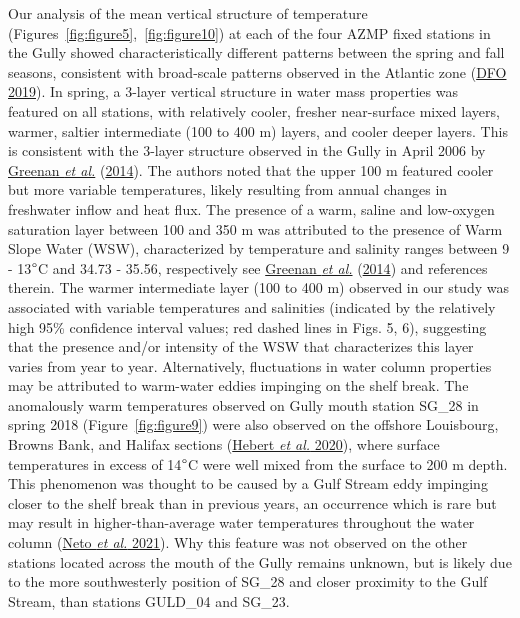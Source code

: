 \documentclass[12pt]{article}\usepackage[]{graphicx}\usepackage[]{color}
\begin{document}
Our analysis of the mean vertical structure of temperature (Figures~\ref{fig:figure5},~\ref{fig:figure10}) at each of the four AZMP fixed stations in the Gully showed characteristically different patterns between the spring and fall seasons, consistent with broad-scale patterns observed in the Atlantic zone (\protect\hyperlink{ref-dfo_2019}{DFO 2019}). In spring, a 3-layer vertical structure in water mass properties was featured on all stations, with relatively cooler, fresher near-surface mixed layers, warmer, saltier intermediate (100 to 400 m) layers, and cooler deeper layers. This is consistent with the 3-layer structure observed in the Gully in April 2006 by \protect\hyperlink{ref-greenan_2014}{Greenan \textit{et al.}} (\protect\hyperlink{ref-greenan_2014}{2014}). The authors noted that the upper 100 m featured cooler but more variable temperatures, likely resulting from annual changes in freshwater inflow and heat flux. The presence of a warm, saline and low-oxygen saturation layer between 100 and 350 m was attributed to the presence of Warm Slope Water (WSW), characterized by temperature and salinity ranges between 9 - 13\(\degree\)C and 34.73 - 35.56, respectively see \thinspace \protect\hyperlink{ref-greenan_2014}{Greenan \textit{et al.}} (\protect\hyperlink{ref-greenan_2014}{2014}) and references therein. The warmer intermediate layer (100 to 400 m) observed in our study was associated with variable temperatures and salinities (indicated by the relatively high 95\% confidence interval values; red dashed lines in Figs. 5, 6), suggesting that the presence and/or intensity of the WSW that characterizes this layer varies from year to year. Alternatively, fluctuations in water column properties may be attributed to warm-water eddies impinging on the shelf break. The anomalously warm temperatures observed on Gully mouth station SG\_28 in spring 2018 (Figure~\ref{fig:figure9}) were also observed on the offshore Louisbourg, Browns Bank, and Halifax sections (\protect\hyperlink{ref-hebert_2020}{Hebert \textit{et al.} 2020}), where surface temperatures in excess of 14\(\degree\)C were well mixed from the surface to 200 m depth. This phenomenon was thought to be caused by a Gulf Stream eddy impinging closer to the shelf break than in previous years, an occurrence which is rare but may result in higher-than-average water temperatures throughout the water column (\protect\hyperlink{ref-neto_2021}{Neto \textit{et al.} 2021}). Why this feature was not observed on the other stations located across the mouth of the Gully remains unknown, but is likely due to the more southwesterly position of SG\_28 and closer proximity to the Gulf Stream, than stations GULD\_04 and SG\_23.
\end{document}

